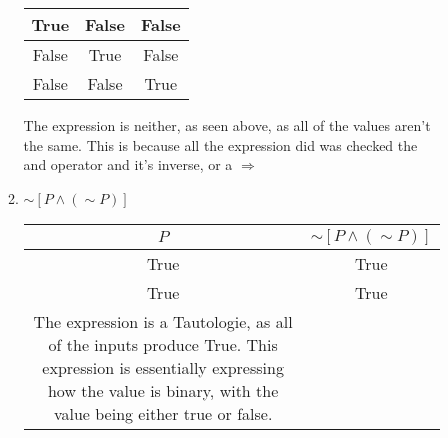 \documentclass{letter}
\begin{document}
\begin{description}
\begin{enumerate}
\begin{enumerate}
\begin{center}
\begin{tabular}{||c|c|c||}
                                    True & False & False \\ \hline
                                    False & True & False \\ \hline
                                    False & False & True \\ \hline
                                    \end{tabular}
                                    \end{center}
The expression is neither, as seen above, as all of the values aren't the same. This is because all the expression did was checked the and operator and it's inverse, or a $\Rightarrow$ \\

				\item $\sim\left[P\wedge (\sim P)\right]$ \\
                                  \begin{center}
                                  \begin{tabular}{||c|c||}
                                    \hline
                                    $P$ & $\sim\left[P\wedge (\sim P)\right]$ \\ \hline
                                    True & True \\ \hline
                                    True & True \\ \hline
The expression is a Tautologie, as all of the inputs produce True. This expression is essentially expressing how the value is binary, with the value being either true or false. \\
             

\end{tabular}
\end{center}
\end{enumerate}
\end{enumerate}
\end{description}
\end{document}
